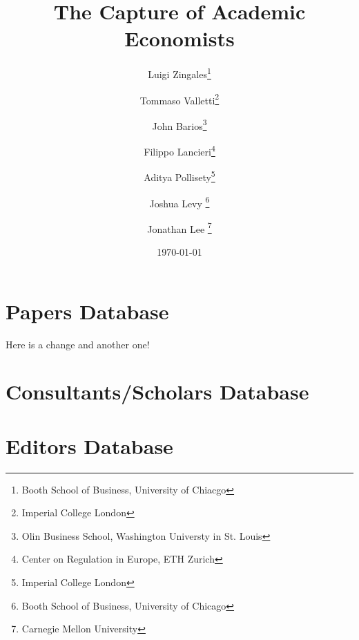 \documentclass[11pt, letterpaper, twoside]{article}
\title{\singlespacing\textbf{The Capture of Academic Economists}}
\author{
    Luigi Zingales\thanks{Booth School of Business, University of Chiacgo} \\
    \and
    Tommaso Valletti\thanks{Imperial College London}\\
    \and
    John Barios\thanks{Olin Business School, Washington Universty in St. Louis}\\
    \and
    Filippo Lancieri\thanks{Center on Regulation in Europe, ETH Zurich} \\
    \and
    Aditya Pollisety\thanks{Imperial College London}\\
    \and
    Joshua Levy \thanks{Booth School of Business, University of Chicago}\\
    \and
    Jonathan Lee \thanks{Carnegie Mellon University}
    }
\date{\today}
\begin{document}
\begin{titlepage}
    \maketitle
    \thispagestyle{empty}
\end{titlepage}


\newpage
{}

\section{Papers Database}


Here is a change and another one!



\section{Consultants/Scholars Database}


\section{Editors Database}
\end{document}

